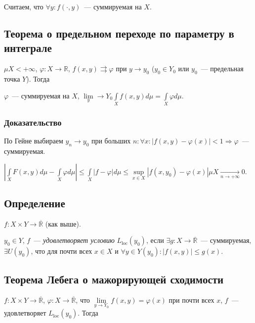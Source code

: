 \documentclass{article}
\begin{document}
    Считаем, что $\forall y : f( \cdot, y )$~--- суммируемая на $X$.
    
    \subsection{Теорема о предельном переходе по параметру в интеграле}
    
        $\mu X < +\infty$, $\varphi : X \rightarrow \mathbb{R}$, $f(x, y) \rightrightarrows \varphi$ при $y \rightarrow y_0$ ($y_0 \in Y_0$ или $y_0$~--- предельная точка $Y$). Тогда
        
        $\varphi$~--- суммируемая на $X$, $\lim\limits_y \rightarrow Y_0 \int\limits_X f(x, y) d \mu = \int\limits_X \varphi d \mu$.
        
        \subsubsection{Доказательство}
        
            По Гейне выбираем $y_n \rightarrow y_0$ при больших $n : \forall x : \left| f(x, y) - \varphi(x) \right| < 1 \Rightarrow \varphi$~--- суммируемая.
        
            $\left| \int\limits_X F(x, y) d \mu - \int\limits_X \varphi d \mu \right| \leqslant \int\limits_X | f - \varphi | d \mu \leqslant \sup\limits_{x \in X} \left| f (x, y_0) - \varphi(x) \right| \mu X \xrightarrow[n \rightarrow +\infty]{} 0$. 
    
    \subsection{Определение}
    
        $f : X \times Y \rightarrow \overline{\mathbb{R}}$ (как выше).
        
        $y_0 \in Y$, $f$~--- \textit{удовлетворяет условию} $L_{\mathrm{loc}}(y_0)$, если $\exists g : X \rightarrow \overline{\mathbb{R}}$~--- суммируемая, $\exists U(y_0)$, что для почти всех $x \in X$ и $\forall y \in Y(y_0) : \left| f(x, y) \right| \leqslant g(x)$.
        
    \subsection{Теорема Лебега о мажорирующей сходимости}
    
        $f : X \times Y \rightarrow \overline{\mathbb{R}}$, $\varphi : X \rightarrow \overline{\mathbb{R}}$, что $\lim\limits_{y \rightarrow Y_0} f(x, y) = \varphi(x)$ при почти всех $x$, $f$~--- удовлетворяет $L_{\mathrm{loc}} (y_0)$. Тогда 
        
\end{document}
